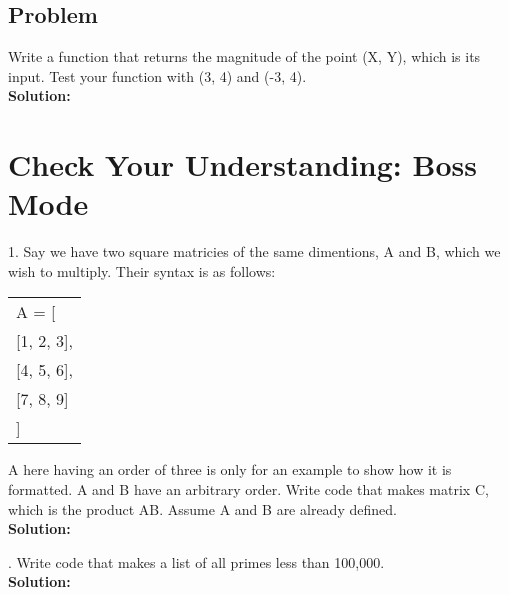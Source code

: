\documentclass{article}
\newcommand{\icode}[1]{{\ttfamily #1}}
\newenvironment{code}{\begin{tcolorbox}\ttfamily}{\end{tcolorbox}}
\begin{document}
\subsection{Problem}
\noindent Write a function that returns the magnitude of the point \icode{(X, Y)}, which is its input. Test your function with \icode{(3, 4)} and \icode{(-3, 4)}.\\
\textbf{Solution:}

\begin{code}
	\vspace{2 in}
\end{code}



\newpage
\section{Check Your Understanding: Boss Mode}
1. Say we have two square matricies of the same dimentions, \icode{A} and \icode{B}, which we wish to multiply. Their syntax is as follows:

\begin{center} \ttfamily
	\begin{tabular}{|l}
		A = [\\
		\phantom{=}[1, 2, 3],\\
		\phantom{=}[4, 5, 6],\\
		\phantom{=}[7, 8, 9]\\
		]
	\end{tabular}
\end{center}
\icode{A} here having an order of three is only for an example to show how it is formatted. \icode{A} and \icode{B} have an arbitrary order. Write code that makes matrix \icode{C}, which is the product \icode{AB}. Assume \icode{A} and \icode{B} are already defined.\\
\noindent \textbf{Solution:}
\begin{code}
	\vspace{6 in}

\end{code}

\newpage
{}. Write code that makes a list of all primes less than 100,000.\\
\noindent \textbf{Solution:}

\begin{code}
	\vspace{8 in}


\end{code}
\end{document}
